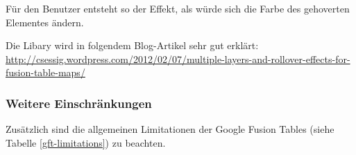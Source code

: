 Für den Benutzer entsteht so der Effekt, als würde sich die Farbe des gehoverten Elementes ändern.

Die Libary wird in folgendem Blog-Artikel sehr gut erklärt: \url{http://csessig.wordpress.com/2012/02/07/multiple-layers-and-rollover-effects-for-fusion-table-maps/}

\subsubsection{Weitere Einschränkungen}
Zusätzlich sind die allgemeinen Limitationen der Google Fusion Tables (siehe Tabelle \ref{gft-limitations}) zu beachten.
